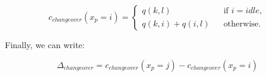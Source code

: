 \begin{equation}
    c_{changeover}(x_p = i) = \left\{ \begin{array}{lcl}
        q(k,l) && \text{if }i=idle, \\
        q(k,i) + q(i,l) && \text{otherwise}.
    \end{array} \right.
\end{equation}

Finally, we can write:

\begin{equation}
    \Delta_{changeover} = c_{changeover}(x_p = j) - c_{changeover}(x_p = i)
\end{equation}
